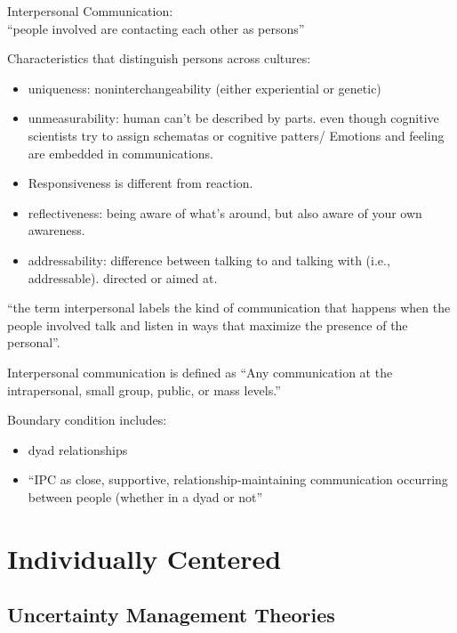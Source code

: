 \documentclass[
]{book}
\providecommand{\tightlist}{%
  \setlength{\itemsep}{0pt}\setlength{\parskip}{0pt}}
\begin{document}
Interpersonal Communication:\\
``people involved are contacting each other as persons''

Characteristics that distinguish persons across cultures:

\begin{itemize}
\tightlist
\item
  uniqueness: noninterchangeability (either experiential or genetic)
\item
  unmeasurability: human can't be described by parts. even though cognitive scientists try to assign schematas or cognitive patters/ Emotions and feeling are embedded in communications.\\
\item
  Responsiveness is different from reaction.
\item
  reflectiveness: being aware of what's around, but also aware of your own awareness.
\item
  addressability: difference between talking to and talking with (i.e., addressable). directed or aimed at.
\end{itemize}

``the term interpersonal labels the kind of communication that happens when the people involved talk and listen in ways that maximize the presence of the personal''.

\citep{Floyd_2014}

Interpersonal communication is defined as ``Any communication at the intrapersonal, small group, public, or mass levels.''

Boundary condition includes:

\begin{itemize}
\tightlist
\item
  dyad relationships\\
\item
  ``IPC as close, supportive, relationship-maintaining communication occurring between people (whether in a dyad or not''
\end{itemize}

\hypertarget{individually-centered}{%
\chapter{Individually Centered}\label{individually-centered}}

\hypertarget{uncertainty-management-theories}{%
\section{Uncertainty Management Theories}\label{uncertainty-management-theories}}
\end{document}
